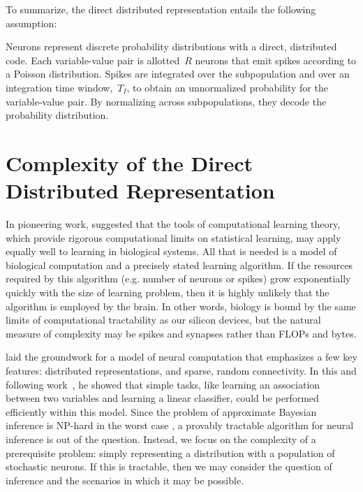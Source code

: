 To summarize, the direct distributed representation entails the following
assumption:

\begin{assumption}
  Neurons represent discrete probability distributions with a direct,
  distributed code. Each variable-value pair is allotted~$R$ neurons
  that emit spikes according to a Poisson distribution.
  Spikes are integrated over the subpopulation and over an integration
  time window,~$T_I$, to obtain an unnormalized probability for the
  variable-value pair. By normalizing across subpopulations, they decode
  the probability distribution. 
\end{assumption}

\section{Complexity of the Direct Distributed Representation}
\label{sec:complexity}

In pioneering work, \citet{valiant1994circuits} suggested that
the tools of computational learning theory, which provide
rigorous computational limits on statistical learning, may
apply equally well to learning in biological systems. All
that is needed is a model of biological computation and a
precisely stated learning algorithm. If the resources
required by this algorithm (e.g. number of neurons or spikes)
grow exponentially quickly with the size of learning problem,
then it is highly unlikely that the algorithm is employed
by the brain. In other words, biology is bound by the same
limits of computational tractability as our silicon devices,
but the natural measure of complexity may be spikes and
synapses rather than FLOPs and bytes.

\citet{valiant1994circuits} laid the groundwork for a model of neural
computation that emphasizes a few key features: distributed
representations, and sparse, random connectivity. In this and
following work~\citep{valiant2005memorization,
  valiant2006quantitative}, he showed that simple tasks, like learning
an association between two variables and learning a linear classifier,
could be performed efficiently within this model. Since the problem of
approximate Bayesian inference is NP-hard in the worst case
\citep{dagum1993approximating, roth1996hardness}, a provably tractable
algorithm for neural inference is out of the question. Instead, we
focus on the complexity of a prerequisite problem: simply representing
a distribution with a population of stochastic neurons. If this is
tractable, then we may consider the question of inference and the
scenarios in which it may be possible.


